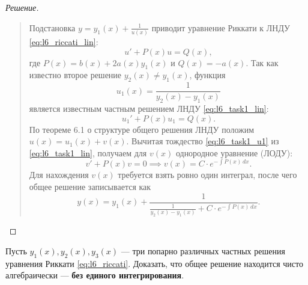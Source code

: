 \begin{proof}[Решение]~\\
    \begin{quote}
        Подстановка $y = y_1(x) + \frac{1}{u(x)}$ приводит уравнение Риккати к
        ЛНДУ \eqref{eq:l6_riccati_lin}:
        \begin{equation} \label{eq:l6_task1_lin}
            u' + P(x) u = Q(x), \tag{18}
        \end{equation}
        где $P(x) = b(x) + 2 a(x) y_1(x)$ и $Q(x) = -a(x)$. Так как известно
        второе решение $y_2(x) \neq y_1(x)$, функция
        \[
            u_1(x) = \frac{1}{y_2(x) - y_1(x)}
        \]
        является известным частным решением ЛНДУ \eqref{eq:l6_task1_lin}:
        \begin{equation} \label{eq:l6_task1_u1}
            u_1' + P(x) u_1 = Q(x). \tag{19}
        \end{equation}
        По теореме 6.1 о структуре общего решения ЛНДУ положим
        $u(x) = u_1(x) + v(x)$. Вычитая тождество \eqref{eq:l6_task1_u1} из
        \eqref{eq:l6_task1_lin}, получаем для $v(x)$ однородное уравнение
        (ЛОДУ):
        \begin{equation} \label{eq:l6_task1_v}
            v' + P(x) v = 0 \implies v(x) = C \cdot e^{-\int P(x) \, dx}.
            \tag{20}
        \end{equation}
        Для нахождения $v(x)$ требуется взять ровно один интеграл, после чего
        общее решение записывается как
        \[
            y(x) = y_1(x) + \frac{1}{\frac{1}{y_2(x) - y_1(x)} +
            C \cdot e^{-\int P(x) \, dx}}.
        \]
    \end{quote}
\end{proof}

\begin{problem}
    Пусть $y_1(x), y_2(x), y_3(x)$ — три попарно различных частных решения
    уравнения Риккати \eqref{eq:l6_riccati}. Доказать, что общее решение
    находится чисто алгебраически — \textbf{без единого интегрирования}.
\end{problem}

